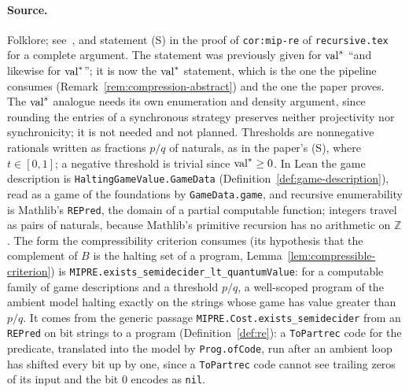 \paragraph{Source.} Folklore; see~\cite[Section 12]{JNVWY20}, and statement (S) in the
proof of \texttt{cor:mip-re} of \texttt{recursive.tex} for a complete argument. The
statement was previously given for $\mathrm{val}^{s}$ ``and likewise for $\mathrm{val}^*$''; it is now the
$\mathrm{val}^*$ statement, which is the one the pipeline consumes
(Remark~\ref{rem:compression-abstract}) and the one the paper proves. The $\mathrm{val}^{s}$
analogue needs its own enumeration and density argument, since rounding the entries of a
synchronous strategy preserves neither projectivity nor synchronicity; it is not needed and
not planned. Thresholds are nonnegative rationals written as fractions $p/q$ of naturals, as
in the paper's (S), where $t \in [0,1]$; a negative threshold is trivial since $\mathrm{val}^*
\geq 0$. In Lean the game description is \texttt{HaltingGameValue.GameData}
(Definition~\ref{def:game-description}), read as a game of the foundations by
\texttt{GameData.game}, and recursive enumerability is Mathlib's \texttt{REPred}, the
domain of a partial computable function; integers travel as pairs of naturals, because
Mathlib's primitive recursion has no arithmetic on $\mathbb{Z}$. The form the
compressibility criterion consumes (its hypothesis that the complement of $B$ is the halting
set of a program, Lemma~\ref{lem:compressible-criterion}) is
\texttt{MIPRE.exists\_semidecider\_lt\_quantumValue}: for a computable family of game
descriptions and a threshold $p/q$, a well-scoped program of the ambient model halting
exactly on the strings whose game has value greater than $p/q$. It comes from the generic
passage \texttt{MIPRE.Cost.exists\_semidecider} from an \texttt{REPred} on bit strings to a
program (Definition~\ref{def:re}): a \texttt{ToPartrec} code for the predicate, translated
into the model by \texttt{Prog.ofCode}, run after an ambient loop has shifted every bit up
by one, since a \texttt{ToPartrec} code cannot see trailing zeros of its input and the bit
$0$ encodes as \texttt{nil}.

